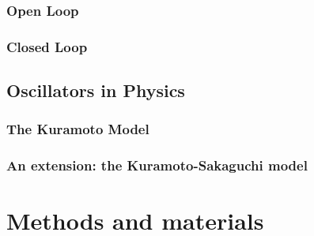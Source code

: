 \documentclass[MSc,english]{Container/thesistemplate}
\begin{document}
\subsection{Open Loop}
\subsection{Closed Loop}

\newpage
\section{Oscillators in Physics}
\subsection{The Kuramoto Model}
\subsection{An extension: the Kuramoto-Sakaguchi model}

\newpage
\chapter{Methods and materials}




\end{document}
